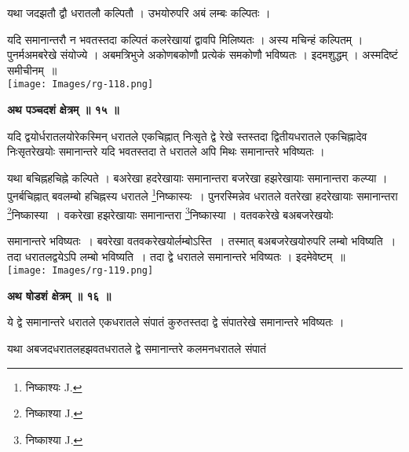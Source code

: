 \documentclass[11pt, openany]{book}
\begin{document}
 यथा जदझतौ द्वौ धरातलौ कल्पितौ  । उभयोरुपरि अबं लम्बः कल्पितः  । 
 
\begin{vwcol}[widths={0.65,0.35}, sep=.8cm, rule=0pt] 
यदि समानान्तरौ न भवतस्तदा कल्पितं कलरेखायां द्वावपि मिलिष्यतः  । अस्य मचिन्हं कल्पितम् । पुनर्मअमबरेखे संयोज्ये  । अबमत्रिभुजे अकोणबकोणौ प्रत्येकं समकोणौ
भविष्यतः  । इदमशुद्धम्  । अस्मदिष्टं समीचीनम्~॥\\
\noindent \texttt{[image: Images/rg-118.png]}
\end{vwcol}
\newpage
\begin{center}
\textbf{\large अथ पञ्चदशं क्षेत्रम् ॥ १५ ॥}
\end{center}
\vspace{5mm}

{\ab यदि द्वयोर्धरातलयोरेकस्मिन् धरातले एकचिह्नात् निःसृते द्वे रेखे स्तस्तदा द्वितीयधरातले एकचिह्नादेव निःसृतरेखयोः समानान्तरे यदि भवतस्तदा ते धरातले अपि मिथः
समानान्तरे भविष्यतः ।}\\
\vspace{3mm}

 यथा बचिह्नहचिह्ने कल्पिते  । बअरेखा हदरेखायाः समानान्तरा 
 बजरेखा हझरेखायाः समानान्तरा कल्प्या  ।
पुनर्बचिह्नात् बवलम्बो हचिह्नस्य धरातले \renewcommand{\thefootnote}{१}\footnote{निष्काश्यः {\en J.}}निष्कास्यः~। पुनरस्मिन्नेव धरातले वतरेखा हदरेखायाः समानान्तरा \renewcommand{\thefootnote}{२}\footnote{निष्काश्या {\en J.}}निष्कास्या~। वकरेखा हझरेखायाः समानान्तरा \renewcommand{\thefootnote}{२}\footnote{निष्काश्या {\en J.}}निष्कास्या । वतवकरेखे बअबजरेखयोः
\begin{vwcol}[widths={0.7,0.3}, sep=.8cm, rule=0pt] 
 समानान्तरे भविष्यतः~। बवरेखा वतवकरेखयोर्लम्बोऽस्ति~। तस्मात् बअबजरेखयोरुपरि लम्बो भविष्यति~। तदा धरातलद्वयेऽपि लम्बो भविष्यति~। तदा द्वे
धरातले समानान्तरे भविष्यतः । इदमेवेष्टम्~॥\\
\noindent \texttt{[image: Images/rg-119.png]}
\end{vwcol}
\vspace{5mm}

\begin{center}
\textbf{\large अथ षोडशं क्षेत्रम् ॥ १६ ॥}
\end{center}
\vspace{5mm}

{\ab ये द्वे समानान्तरे धरातले एकधरातले संपातं कुरुतस्तदा द्वे संपातरेखे समानान्तरे भविष्यतः  ।}\\
\vspace{5mm}

 यथा अबजदधरातलहझवतधरातले द्वे समानान्तरे कलमनधरातले संपातं 
 
\end{document}
